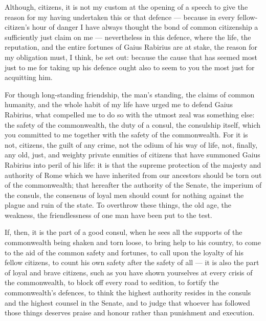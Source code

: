 
 Although, citizens, it is not my custom at the opening of a speech to give the reason for my having undertaken this or that defence --- because in every fellow-citizen's hour of danger I have always thought the bond of common citizenship a sufficiently just claim on me --- nevertheless in this defence, where the life, the reputation, and the entire fortunes of Gaius Rabirius are at stake, the reason for my obligation must, I think, be set out: because the cause that has seemed most just to me for taking up his defence ought also to seem to you the most just for acquitting him.

 For though long-standing friendship, the man's standing, the claims of common humanity, and the whole habit of my life have urged me to defend Gaius Rabirius, what compelled me to do so with the utmost zeal was something else: the safety of the commonwealth, the duty of a consul, the consulship itself, which you committed to me together with the safety of the commonwealth. For it is not, citizens, the guilt of any crime, not the odium of his way of life, not, finally, any old, just, and weighty private enmities of citizens that have summoned Gaius Rabirius into peril of his life: it is that the supreme protection of the majesty and authority of Rome which we have inherited from our ancestors should be torn out of the commonwealth; that hereafter the authority of the Senate, the imperium of the consuls, the consensus of loyal men should count for nothing against the plague and ruin of the state. To overthrow these things, the old age, the weakness, the friendlessness of one man have been put to the test.

 If, then, it is the part of a good consul, when he sees all the supports of the commonwealth being shaken and torn loose, to bring help to his country, to come to the aid of the common safety and fortunes, to call upon the loyalty of his fellow citizens, to count his own safety after the safety of all --- it is also the part of loyal and brave citizens, such as you have shown yourselves at every crisis of the commonwealth, to block off every road to sedition, to fortify the commonwealth's defences, to think the highest authority resides in the consuls and the highest counsel in the Senate, and to judge that whoever has followed those things deserves praise and honour rather than punishment and execution.

